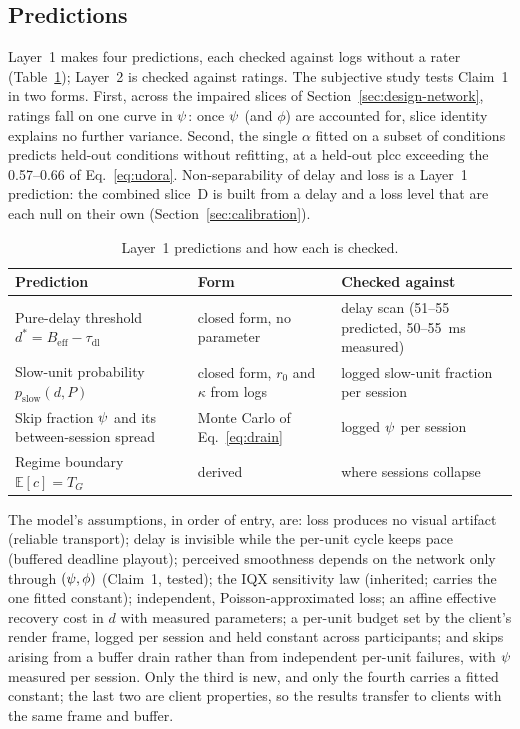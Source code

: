 \subsection{Predictions}
\label{sec:model-predictions}
Layer~1 makes four predictions, each checked against logs without a
rater (Table~\ref{tab:predictions}); Layer~2 is checked against
ratings. The subjective study tests Claim~1 in two forms. First, across
the impaired slices of Section~\ref{sec:design-network}, ratings fall
on one curve in $\psi$: once $\psi$ (and $\phi$) are accounted for,
slice identity explains no further variance. Second, the single
$\alpha$ fitted on a subset of conditions predicts held-out conditions
without refitting, at a held-out \gls{plcc} exceeding the 0.57--0.66
of Eq.~\eqref{eq:udora}. Non-separability of delay and loss is a
Layer~1 prediction: the combined slice~D is built from a delay and a
loss level that are each null on their own
(Section~\ref{sec:calibration}).

\begin{table}[t]
  \caption{Layer~1 predictions and how each is checked.}
  \label{tab:predictions}
  \centering
  \small
  \begin{tabularx}{\textwidth}{@{}>{\raggedright\arraybackslash}p{5.2cm}>{\raggedright\arraybackslash}p{3.6cm}>{\raggedright\arraybackslash}X@{}}
    \toprule
    Prediction & Form & Checked against \\
    \midrule
    Pure-delay threshold $d^\ast = B_{\mathrm{eff}} - \tau_{\mathrm{dl}}$ & closed form, no parameter & delay scan (51--55 predicted, 50--\SI{55}{\milli\second} measured) \\
    Slow-unit probability $p_{\mathrm{slow}}(d,P)$ & closed form, $r_0$ and $\kappa$ from logs & logged slow-unit fraction per session \\
    Skip fraction $\psi$ and its between-session spread & Monte Carlo of Eq.~\eqref{eq:drain} & logged $\psi$ per session \\
    Regime boundary $\mathbb{E}[c] = T_G$ & derived & where sessions collapse \\
    \bottomrule
  \end{tabularx}
\end{table}

The model's assumptions, in order of entry, are: loss produces no
visual artifact (reliable transport); delay is invisible while the
per-unit cycle keeps pace (buffered deadline playout); perceived
smoothness depends on the network only through $(\psi, \phi)$
(Claim~1, tested); the IQX sensitivity law (inherited; carries the one
fitted constant); independent, Poisson-approximated loss; an affine
effective recovery cost in $d$ with measured parameters; a per-unit
budget set by the client's render frame, logged per session and held
constant across participants; and skips arising from a buffer drain
rather than from independent per-unit failures, with $\psi$ measured
per session. Only the third is new, and only the fourth carries a
fitted constant; the last two are client properties, so the results
transfer to clients with the same frame and buffer.
